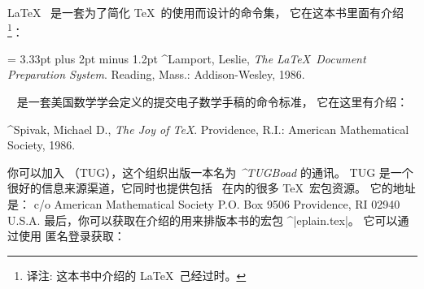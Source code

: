 \LaTeX\  是一套为了简化 \TeX\ 的使用而设计的命令集，
它在这本书里面有介绍\footnote{译注: 这本书中介绍的 \LaTeX\ 己经过时。}：
\smallskip
{\narrower\noindent\frenchspacing\spaceskip = 3.33pt plus 2pt minus 1.2pt
^{Lamport, Leslie}, {\sl The \LaTeX\ Document Preparation System}.
Reading, Mass.: Addison-Wesley, 1986.\par}
\smallskip
\noindent
\AMSTeX\  是一套美国数学学会定义的提交电子数学手稿的命令标准，
它在这里有介绍：
\smallskip
{\narrower\noindent
^{Spivak, Michael D.}, {\sl The Joy of \TeX}. Providence, R.I.:
American Mathematical Society, 1986.
\par}
\smallskip
\noindent
你可以加入 \TUG{}（TUG），这个组织出版一本名为 {\it ^{TUGBoad}} 的通讯。
TUG 是一个很好的信息来源渠道，它同时也提供包括 \AMSTeX\ 在内的很多 \TeX\ 宏包资源。
它的地址是：
\smallskip
{\obeylines
\TUG{}
c/o American Mathematical Society
P.O. Box 9506
Providence,  RI  02940
U.S.A.
}
\smallskip
\noindent
最后，你可以获取在介绍的用来排版本书的宏包 ^|eplain.tex|。
它可以通过使用 \ftp 匿名登录获取：
{\obeylines{}}

